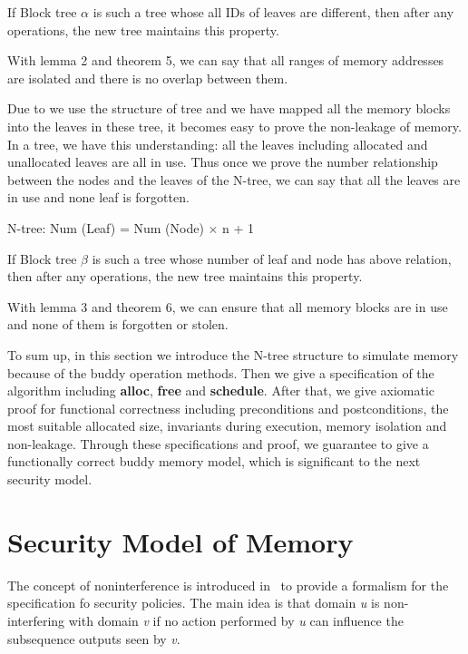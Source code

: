 \documentclass[runningheads]{llncs}
\begin{document}
\begin{theorem}
If Block tree $\alpha$ is such a tree whose all IDs of leaves are different, then after any operations, the new tree maintains this property.
\end{theorem}

With lemma 2 and theorem 5, we can say that all ranges of memory addresses are isolated and there is no overlap between them.

Due to we use the structure of tree and we have mapped all the memory blocks into the leaves in these tree, it becomes easy to prove the non-leakage of memory. In a tree, we have this understanding: all the leaves including allocated and unallocated leaves are all in use. Thus once we prove the number relationship between the nodes and the leaves of the N-tree, we can say that all the leaves are in use and none leaf is forgotten.

\begin{lemma}
N-tree: Num (Leaf) = Num (Node) $\times$ n + 1
\end{lemma}

\begin{theorem}
If Block tree $\beta$ is such a tree whose number of leaf and node has above relation, then after any operations, the new tree maintains this property.
\end{theorem}

With lemma 3 and theorem 6, we can ensure that all memory blocks are in use and none of them is forgotten or stolen.

To sum up, in this section we introduce the N-tree structure to simulate memory because of the buddy operation methods. Then we give a specification of the algorithm including \textbf{alloc}, \textbf{free} and \textbf{schedule}. After that, we give axiomatic proof for functional correctness including preconditions and postconditions, the most suitable allocated size, invariants during execution, memory isolation and non-leakage. Through these specifications and proof, we guarantee to give a functionally correct buddy memory model, which is significant to the next security model.


\section{Security Model of Memory}
The concept of noninterference is introduced in~\cite{reg_noninterference} to provide a formalism for the specification fo security policies. The main idea is that domain \textsl{u} is non-interfering with domain \textsl{v} if no action performed by \textsl{u} can influence the subsequence outputs seen by \textsl{v}.
\end{document}
